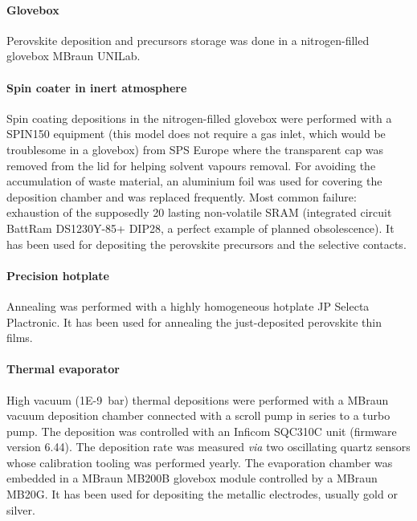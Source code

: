 		\paragraph{Glovebox}
		Perovskite deposition and precursors storage was done in a nitrogen-filled glovebox MBraun UNILab.

		\paragraph{Spin coater in inert atmosphere}
		Spin coating depositions in the nitrogen-filled glovebox were performed with a SPIN150 equipment (this model does not require a gas inlet, which would be troublesome in a glovebox) from SPS Europe where the transparent cap was removed from the lid for helping solvent vapours removal.
		For avoiding the accumulation of waste material, an aluminium foil was used for covering the deposition chamber and was replaced frequently.
		Most common failure: exhaustion of the supposedly \SI{20}{\year} lasting non-volatile SRAM (integrated circuit BattRam DS1230Y-85+ DIP28, a perfect example of planned obsolescence).
		It has been used for depositing the perovskite precursors and the  selective contacts.

		\paragraph{Precision hotplate}
		Annealing was performed with a highly homogeneous hotplate JP Selecta Plactronic.
		It has been used for annealing the just-deposited perovskite thin films.

		\paragraph{Thermal evaporator}
		High vacuum (\SI{1E-9}{\bar}) thermal depositions were performed with a MBraun vacuum deposition chamber connected with a scroll pump in series to a turbo pump.
		The deposition was controlled with an Inficom SQC310C unit (firmware version 6.44).
		The deposition rate was measured \textsl{via} two oscillating quartz sensors whose calibration tooling was performed yearly.
		The evaporation chamber was embedded in a MBraun MB200B glovebox module controlled by a MBraun MB20G.
		It has been used for depositing the metallic electrodes, usually gold or silver.

